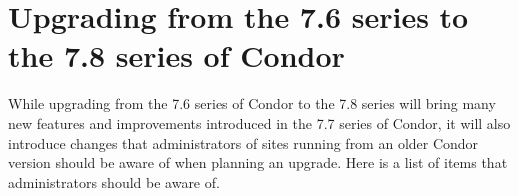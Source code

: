 \section{\label{sec:gotchas}Upgrading from the 7.6 series to the 7.8 series of Condor}

While upgrading from the 7.6 series of Condor to the 7.8 series will bring many
new features and improvements introduced in the 7.7 series of Condor, it will
also introduce changes that administrators of sites running from an older
Condor version should be aware of when planning an upgrade.  Here is a list of
items that administrators should be aware of.


